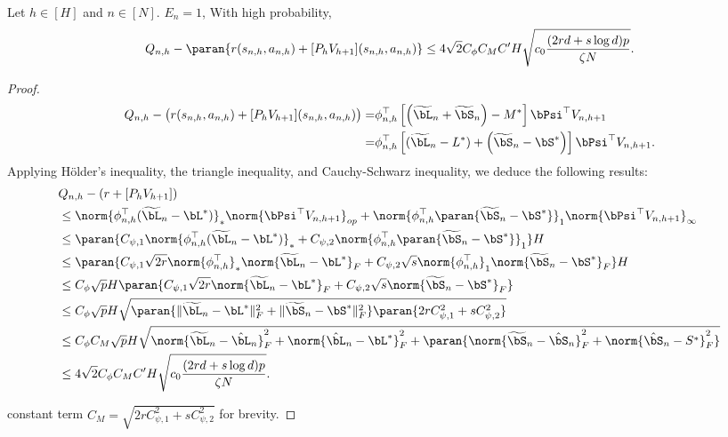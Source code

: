 \begin{lemma}\label{lem:boundQ} 
     Let $h \in [H]$ and $n \in [N]$. $E_n=1$, With high probability,     
     $$Q_{n,h}-\paran{r(s_{n,h},a_{n,h})+[P_h V_{h+1}](s_{n,h},a_{n,h})}
     \leq 4\sqrt{2}C_{\phi}C_{M}C' H\sqrt{c_0\frac{(2rd+s\log d)p}{\zeta N}}.$$
     \end{lemma}

\begin{proof}

   \begin{align*}
   Q_{n,h} - \big(r(s_{n,h},a_{n,h}) + [P_h V_{h+1}](s_{n,h},a_{n,h})\big) 
   =& \phi_{n, h}^{\top}\left[\left(\widetilde{\bL}_{n} + \widetilde{\bS}_{n}\right) - M^*\right] \bPsi^{\top} V_{n, h+1} \\
   = &\phi_{n, h}^{\top}\left[(\widetilde{\bL}_{n}-L^*) + \left(\widetilde{\bS}_{n}-\bS^{*}\right)\right] \bPsi^{\top} V_{n, h+1}.
    \end{align*}
        Applying Hölder's inequality, the triangle inequality, and Cauchy-Schwarz inequality, we deduce the following results:
     \begin{equation}
     \begin{aligned}
     &Q_{n,h} - \left(r + [P_h V_{h+1}]\right) \\
     &\leq \norm{\phi_{n, h}^{\top}(\widetilde{\bL}_{n} - \bL^{*})}_*\norm{\bPsi^{\top} V_{n, h+1}}_{op}+\norm{\phi_{n, h}^{\top}\paran{\widetilde{\bS}_{n} - \bS^*}}_1\norm{\bPsi^{\top} V_{n, h+1}}_{\infty} \\
     & \leq \paran{C_{\psi,1}\norm{\phi_{n, h}^{\top}(\widetilde{\bL}_{n} - \bL^*)}_*+C_{\psi,2}\norm{\phi_{n, h}^{\top}\paran{\widetilde{\bS}_{n} - \bS^{*}}}_1}H \\
     & \leq \paran{C_{\psi,1}\sqrt{2r}\norm{\phi_{n, h}^{\top}}_*\norm{\widetilde{\bL}_{n} - \bL^{*}}_F + C_{\psi,2}\sqrt{s}\norm{\phi_{n, h}^{\top}}_1\norm{\widetilde{\bS}_{n} - \bS^{*}}_F}H \\
     & \leq C_{\phi}\sqrt{p}H\paran{C_{\psi,1}\sqrt{2r}\norm{\widetilde{\bL}_{n} - \bL^*}_F + C_{\psi,2}\sqrt{s}
     \norm{\widetilde{\bS}_{n} - \bS^{*}}_F} \\
     & \leq C_{\phi}\sqrt{p}H \sqrt{\paran{ \|\widetilde{\bL}_{n} - \bL^*\|_F^2 +   \|\widetilde{\bS}_{n} - \bS^{*}\|_F^2}\paran{2rC_{\psi,1}^2+sC_{\psi,2}^2}}\\
     &\leq C_{\phi}C_{M}\sqrt{p}H
     \sqrt{
     \norm{\widetilde{\bL}_n -\hat\bL_n}^2_F + 
     \norm{\hat\bL_n -\bL^*}^2_F+\paran{\norm{\widetilde{\bS}_{n} - \hat\bS_n}^2_F+\norm{\hat\bS_n - S^{*}}^2_F}} \\
     & \leq 4\sqrt{2}C_{\phi}C_{M}C' H\sqrt{c_0\frac{(2rd+s\log d)p}{\zeta N}}.
     \end{aligned}
    \end{equation}

 constant term $C_M=\sqrt{2rC_{\psi,1}^2+sC_{\psi,2}^2}$ for brevity.
\end{proof}



